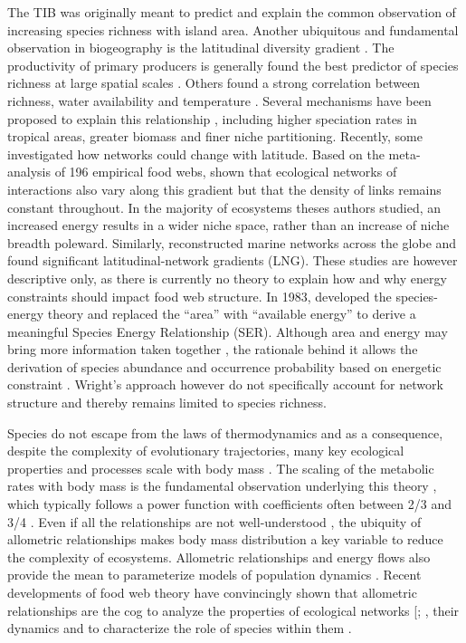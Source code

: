 The TIB was originally meant to predict and explain the common
observation of increasing species richness with island area. Another
ubiquitous and fundamental observation in biogeography is the
latitudinal diversity gradient
\citep[LDG,][]{Rhode1992, Stevens1989, Evans2005}. The productivity of
primary producers is generally found the best predictor of species
richness at large spatial scales \citep{Evans2005, Storch2005}. Others
found a strong correlation between richness, water availability and
temperature \citep[\citet{Hawkins2003}]{Currie1993}. Several mechanisms
have been proposed to explain this relationship
\citep[see][\citet{Evans2005} for a review]{Currie2004}, including
higher speciation rates in tropical areas, greater biomass and finer
niche partitioning. Recently, some investigated how networks could
change with latitude. Based on the meta-analysis of 196 empirical food
webs, \citet{Cirtwill2015a} shown that ecological networks of
interactions also vary along this gradient but that the density of links
remains constant throughout. In the majority of ecosystems theses
authors studied, an increased energy results in a wider niche space,
rather than an increase of niche breadth poleward. Similarly,
\citet{Albouy2016} reconstructed marine networks across the globe and
found significant latitudinal-network gradients (LNG). These studies are
however descriptive only, as there is currently no theory to explain how
and why energy constraints should impact food web structure. In 1983,
\citet{Wright1983} developed the species-energy theory and replaced the
``area'' with ``available energy'' to derive a meaningful Species Energy
Relationship (SER). Although area and energy may bring more information
taken together \citep{Storch2005}, the rationale behind it allows the
derivation of species abundance and occurrence probability based on
energetic constraint \citep{Wright1983}. Wright's approach however do
not specifically account for network structure and thereby remains
limited to species richness.

Species do not escape from the laws of thermodynamics and as a
consequence, despite the complexity of evolutionary trajectories, many
key ecological properties and processes scale with body mass
\citep[i.e.~metabolic theory of ecology@Brown2004;][]{Woodward2005a}.
The scaling of the metabolic rates with body mass is the fundamental
observation underlying this theory \citep{Gillooly2001}, which typically
follows a power function with coefficients often between 2/3 and 3/4
\citep{White2013}. Even if all the relationships are not well-understood
\citep[see the case of abundances reviewed in][ and the recent
relationship between prey and predator biomasses
\citet{Hatton2015}]{White2007}, the ubiquity of allometric relationships
makes body mass distribution a key variable to reduce the complexity of
ecosystems. Allometric relationships and energy flows also provide the
mean to parameterize models of population dynamics \citep{Yodzis1992}.
Recent developments of food web theory have convincingly shown that
allometric relationships are the cog to analyze the properties of
ecological networks {[}\citet{Gravel2013}; \citet{Petchey2008}, their
dynamics \citep{Brose2006} and to characterize the role of species
within them \citep{Schneider2012}.


